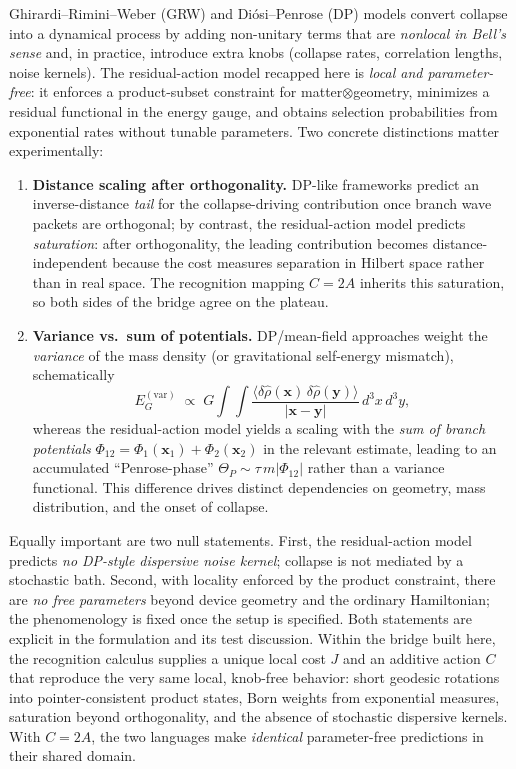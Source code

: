\documentclass[11pt,letterpaper]{article}
\theoremstyle{definition}
\begin{document}
Ghirardi–Rimini–Weber (GRW) and Diósi–Penrose (DP) models convert collapse into a dynamical process by adding non-unitary terms that are \emph{nonlocal in Bell's sense} and, in practice, introduce extra knobs (collapse rates, correlation lengths, noise kernels). The residual-action model recapped here is \emph{local and parameter-free}: it enforces a product-subset constraint for matter$\otimes$geometry, minimizes a residual functional in the energy gauge, and obtains selection probabilities from exponential rates without tunable parameters.
Two concrete distinctions matter experimentally:
\begin{enumerate}
\item \textbf{Distance scaling after orthogonality.}  
DP-like frameworks predict an inverse-distance \emph{tail} for the collapse-driving contribution once branch wave packets are orthogonal; by contrast, the residual-action model predicts \emph{saturation}: after orthogonality, the leading contribution becomes distance-independent because the cost measures separation in Hilbert space rather than in real space. The recognition mapping $C=2A$ inherits this saturation, so both sides of the bridge agree on the plateau.\item \textbf{Variance vs.\ sum of potentials.}  
DP/mean-field approaches weight the \emph{variance} of the mass density (or gravitational self-energy mismatch), schematically
\[
E_G^{(\mathrm{var})}\;\propto\;G\int\!\!\int \frac{\langle \delta \hat\rho(\mathbf x)\,\delta \hat\rho(\mathbf y)\rangle}{|\mathbf x-\mathbf y|}\,d^3x\,d^3y,
\]
whereas the residual-action model yields a scaling with the \emph{sum of branch potentials} $\Phi_{12}=\Phi_1(\mathbf x_1)+\Phi_2(\mathbf x_2)$ in the relevant estimate, leading to an accumulated ``Penrose-phase'' $\Theta_P\sim \tau\,m|\Phi_{12}|$ rather than a variance functional. This difference drives distinct dependencies on geometry, mass distribution, and the onset of collapse.\end{enumerate}

Equally important are two null statements. First, the residual-action model predicts \emph{no DP-style dispersive noise kernel}; collapse is not mediated by a stochastic bath. Second, with locality enforced by the product constraint, there are \emph{no free parameters} beyond device geometry and the ordinary Hamiltonian; the phenomenology is fixed once the setup is specified. Both statements are explicit in the formulation and its test discussion.
Within the bridge built here, the recognition calculus supplies a unique local cost $J$ and an additive action $C$ that reproduce the very same local, knob-free behavior: short geodesic rotations into pointer-consistent product states, Born weights from exponential measures, saturation beyond orthogonality, and the absence of stochastic dispersive kernels. With $C=2A$, the two languages make \emph{identical} parameter-free predictions in their shared domain.
\end{document}
